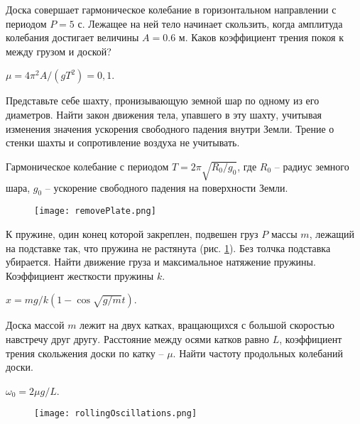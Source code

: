 \begin{ex} %
Доска совершает гармоническое колебание в горизонтальном направлении с периодом $P = 5$ с. Лежащее на ней тело начинает скользить, когда амплитуда колебания достигает величины $A = 0.6$ м. Каков коэффициент трения покоя к между грузом и доской?
\begin{ans}
$\mu = 4 \pi^2 A / (gT^2) = 0,1$.
\end{ans}
\end{ex}	

\complexProblems

\begin{ex} %
Представьте себе шахту, пронизывающую земной шар по одному из его диаметров. Найти закон движения тела, упавшего в эту шахту, учитывая изменения значения ускорения свободного падения внутри Земли. Трение о стенки шахты и сопротивление воздуха не учитывать.
\begin{ans}
Гармоническое колебание с периодом $T = 2 \pi \sqrt{R_0 / g_0}$, где $R_0$ -- радиус земного шара, $g_0$ -- ускорение свободного падения на поверхности Земли.
\end{ans}
\end{ex}	

\begin{figure}[h]
\centering
\texttt{[image: removePlate.png]}
\caption{}
\label{removePlate}
\end{figure}

\begin{ex} %
К пружине, один конец которой закреплен, подвешен груз $P$ массы $m$, лежащий на подставке так, что пружина не растянута (рис. \ref{removePlate}). Без толчка подставка убирается. Найти движение груза и максимальное натяжение пружины. Коэффициент жесткости пружины $k$.
\begin{ans}
$x = mg/k(1-\cos \sqrt{g/m} t)$.
\end{ans}
\end{ex}	

\begin{ex}
Доска массой $m$ лежит на двух катках, вращающихся с большой скоростью навстречу друг другу. Расстояние между осями катков равно $L$, коэффициент трения скольжения доски по катку – $\mu$. Найти частоту продольных колебаний доски.
\begin{ans}
$\omega_0 = 2\mu g /L$.
\end{ans}
\end{ex}	

\begin{figure}[h]
\centering
\texttt{[image: rollingOscillations.png]}
\caption{}
\end{figure}

